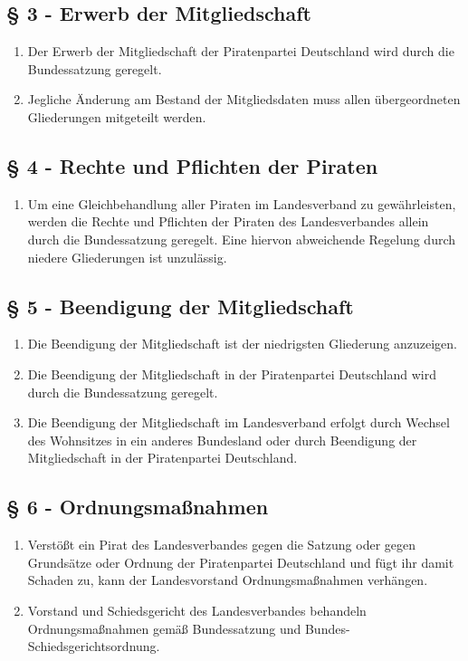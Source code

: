 \subsection{§ 3 - Erwerb der Mitgliedschaft}
\begin{enumerate}
\item Der Erwerb der Mitgliedschaft der Piratenpartei Deutschland wird durch die
Bundessatzung geregelt.

\item Jegliche Änderung am Bestand der Mitgliedsdaten muss allen übergeordneten
Gliederungen mitgeteilt werden.
\end{enumerate}

\subsection{§ 4 - Rechte und Pflichten der Piraten}
\begin{enumerate}
\item Um eine Gleichbehandlung aller Piraten im Landesverband zu gewährleisten,
werden die Rechte und Pflichten der Piraten des Landesverbandes allein durch die
Bundessatzung geregelt. Eine hiervon abweichende Regelung durch niedere
Gliederungen ist unzulässig.
\end{enumerate}

\subsection{§ 5 - Beendigung der Mitgliedschaft}
\begin{enumerate}
\item Die Beendigung der Mitgliedschaft ist der niedrigsten Gliederung anzuzeigen.

\item Die Beendigung der Mitgliedschaft in der Piratenpartei Deutschland wird
durch die Bundessatzung geregelt.

\item Die Beendigung der Mitgliedschaft im Landesverband erfolgt durch Wechsel
des Wohnsitzes in ein anderes Bundesland oder durch Beendigung der
Mitgliedschaft in der Piratenpartei Deutschland.
\end{enumerate}

\subsection{§ 6 - Ordnungsmaßnahmen}
\begin{enumerate}
\item Verstößt ein Pirat des Landesverbandes gegen die Satzung oder gegen
Grundsätze oder Ordnung der Piratenpartei Deutschland und fügt ihr damit Schaden
zu, kann der Landesvorstand Ordnungsmaßnahmen verhängen.

\item Vorstand und Schiedsgericht des Landesverbandes behandeln
Ordnungsmaßnahmen gemäß Bundessatzung und Bundes-Schiedsgerichtsordnung.
\end{enumerate}

